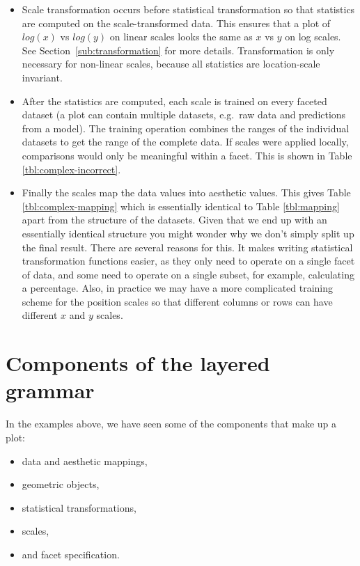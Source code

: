 \begin{itemize}
  \item  Scale transformation occurs before statistical transformation so that statistics are computed on the scale-transformed data.  This ensures that a plot of $log(x)$ vs $log(y)$ on linear scales looks the same as $x$ vs $y$ on log scales.  See Section~\ref{sub:transformation} for more details. Transformation is only necessary for non-linear scales, because all statistics are location-scale invariant.

  \item After the statistics are computed, each scale is trained on every faceted dataset (a plot can contain multiple datasets, e.g.\ raw data and predictions from a model).  The training operation combines the ranges of the individual datasets to get the range of the complete data.  If scales were applied locally, comparisons would only be meaningful within a facet.  This is shown in Table \ref{tbl:complex-incorrect}.

  \item Finally the scales map the data values into aesthetic values.  This gives Table \ref{tbl:complex-mapping} which is essentially identical to Table \ref{tbl:mapping} apart from the structure of the datasets.  Given that we end up with an essentially identical structure you might wonder why we don't simply split up the final result.  There are several reasons for this.  It makes writing statistical transformation functions easier, as they only need to operate on a single facet of data, and some need to operate on a single subset, for example, calculating a percentage.  Also, in practice we may have a more complicated training scheme for the position scales so that different columns or rows can have different $x$ and $y$ scales.  
  
\end{itemize}



\section{Components of the layered grammar}
\label{sec:components}

In the examples above, we have seen some of the components that make up a plot:

\begin{itemize}
  \item data and aesthetic mappings,
  \item geometric objects, 
  \item statistical transformations,
  \item scales,
  \item and facet specification.
\end{itemize}

